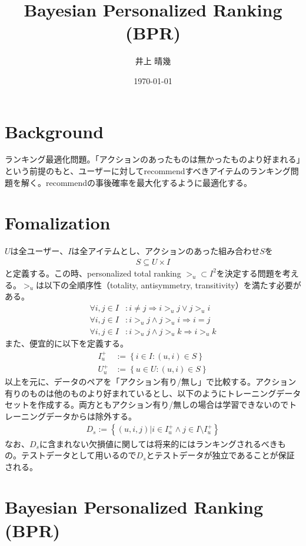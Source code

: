 \documentclass[onecolumn,10pt]{article}
\title{Bayesian Personalized Ranking (BPR) }
\author{井上 晴幾}
\date{\today}
\begin{document}
 
\maketitle 
\tableofcontents
\newpage

\section{Background}
ランキング最適化問題。「アクションのあったものは無かったものより好まれる」という前提のもと、ユーザーに対してrecommendすべきアイテムのランキング問題を解く。recommendの事後確率を最大化するように最適化する。

\section{Fomalization}
$U$は全ユーザー、$I$は全アイテムとし、アクションのあった組み合わせ$S$を
\begin{align}
	S \subseteq U \times I
\end{align}
と定義する。この時、personalized total ranking $>_u \subset I^2$を決定する問題を考える。$>_u$は以下の全順序性（totality, antisymmetry, transitivity）を満たす必要がある。
\begin{align}
	\forall i, j \in I &: i \neq j \Rightarrow i >_u j \lor j >_u i \\
	\forall i, j \in I &: i >_u j \land j >_u i \Rightarrow i = j \\
	\forall i, j \in I &: i >_u j \land j >_u k \Rightarrow i >_u k
\end{align}
また、便宜的に以下を定義する。
\begin{align}
	I_{u}^{+}  &:= \left\{i \in I : (u, i) \in S \right\} \\
	U_{u}^{+}  &:= \left\{u \in U : (u, i) \in S \right\}
\end{align}
以上を元に、データのペアを「アクション有り/無し」で比較する。アクション有りのものは他のものより好まれているとし、以下のようにトレーニングデータセットを作成する。両方ともアクション有り/無しの場合は学習できないのでトレーニングデータからは除外する。
\begin{align}
	D_s := \left\{(u, i, j) | i \in I_{u}^{+} \land j \in I \setminus  I_{u}^{+} \right\}
\end{align}
なお、$D_s$に含まれない欠損値に関しては将来的にはランキングされるべきもの。テストデータとして用いるので$D_s$とテストデータが独立であることが保証される。

\section{Bayesian Personalized Ranking (BPR)}
\end{document}

